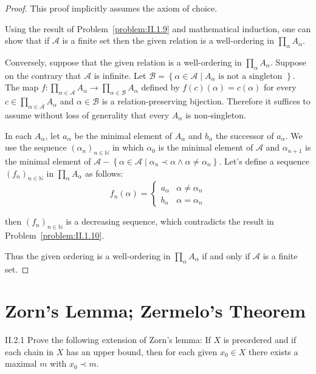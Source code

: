 \begin{proof}
	This proof implicitly assumes the axiom of choice.

	Using the result of Problem~\ref{problem:II.1.9} and mathematical induction, one can show that if \( \mathscr{A} \) is a finite set then the given relation is a well-ordering in \( \prod_{\alpha} A_{\alpha} \).

	Conversely, suppose that the given relation is a well-ordering in \( \prod_{\alpha} A_{\alpha} \). Suppose on the contrary that \( \mathscr{A} \) is infinite. Let \( \mathscr{B} = \left\{ \alpha \in \mathscr{A} \mid A_{\alpha} \text{ is not a singleton } \right\} \). The map \( f: \prod_{\alpha\in \mathscr{A}} A_{\alpha} \to \prod_{\alpha\in \mathscr{B}} A_{\alpha} \) defined by \( f(c)(\alpha) = c(\alpha) \) for every \( c \in \prod_{\alpha\in\mathscr{A}} A_{\alpha} \) and \( \alpha \in \mathscr{B} \) is a relation-preserving bijection. Therefore it suffices to assume without loss of generality that every \( A_{\alpha} \) is non-singleton.

	In each \( A_{\alpha} \), let \( a_{\alpha} \) be the minimal element of \( A_{\alpha} \) and \( b_{\alpha} \) the successor of \( a_{\alpha} \). We use the sequence \( {(\alpha_{n})}_{n\in\mathbb{N}} \) in which \( \alpha_{0} \) is the minimal element of \( \mathscr{A} \) and \( \alpha_{n+1} \) is the minimal element of \( \mathscr{A} - \left\{ \alpha \in \mathscr{A} \mid \alpha_{n} \prec \alpha \land \alpha \ne \alpha_{n} \right\} \). Let's define a sequence \( {(f_{n})}_{n\in\mathbb{N}} \) in \( \prod_{\alpha} A_{\alpha} \) as follows:
	\[
		f_{n}(\alpha) = \begin{cases}
			a_{\alpha} & \alpha \ne \alpha_{n} \\
			b_{\alpha} & \alpha = \alpha_{n}
		\end{cases}
	\]

	then \( {(f_{n})}_{n\in\mathbb{N}} \) is a decreasing sequence, which contradicts the result in Problem~\ref{problem:II.1.10}.

	Thus the given ordering is a well-ordering in \(\prod_{\alpha} A_{\alpha}\) if and only if \(\mathscr{A}\) is a finite set.
\end{proof}

\section{Zorn's Lemma; Zermelo's Theorem}

\begin{problem}{II.2.1}
Prove the following extension of Zorn's lemma: If \( X \) is preordered and if each chain in \(X\) has an upper bound, then for each given \( x_{0} \in X \) there exists a maximal \( m \) with \( x_{0} \prec m \).
\end{problem}

